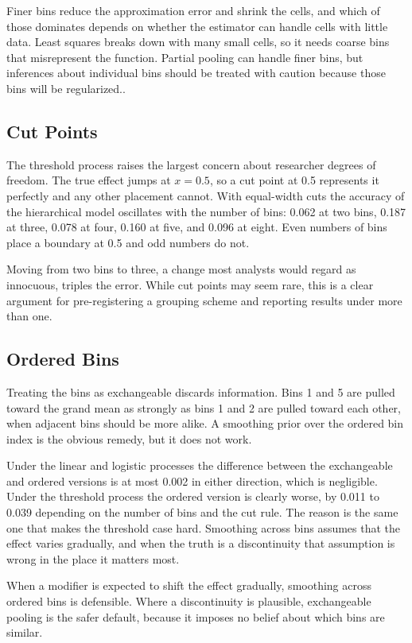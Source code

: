 \documentclass[12pt]{article}
\begin{document}
Finer bins reduce the approximation error and shrink the cells, and which of those dominates depends on whether the estimator can handle cells with little data.
Least squares breaks down with many small cells, so it needs coarse bins that misrepresent the function. 
Partial pooling can handle finer bins, but inferences about individual bins should be treated with caution because those bins will be regularized..

\subsection{Cut Points}

The threshold process raises the largest concern about researcher degrees of freedom.
The true effect jumps at $x = 0.5$, so a cut point at 0.5 represents it perfectly and any other placement cannot.
With equal-width cuts the accuracy of the hierarchical model oscillates with the number of bins: 0.062 at two bins, 0.187 at three, 0.078 at four, 0.160 at five, and 0.096 at eight.
Even numbers of bins place a boundary at 0.5 and odd numbers do not.

Moving from two bins to three, a change most analysts would regard as innocuous, triples the error.
While cut points may seem rare, this is a clear argument for pre-registering a grouping scheme and reporting results under more than one.

\subsection{Ordered Bins}

Treating the bins as exchangeable discards information. Bins 1 and 5 are pulled toward the grand mean as strongly as bins 1 and 2 are pulled toward each other, when adjacent bins should be more alike.
A smoothing prior over the ordered bin index is the obvious remedy, but it does not work.

Under the linear and logistic processes the difference between the exchangeable and ordered versions is at most 0.002 in either direction, which is negligible.
Under the threshold process the ordered version is clearly worse, by 0.011 to 0.039 depending on the number of bins and the cut rule.
The reason is the same one that makes the threshold case hard. Smoothing across bins assumes that the effect varies gradually, and when the truth is a discontinuity that assumption is wrong in the place it matters most.


When a modifier is expected to shift the effect gradually, smoothing across ordered bins is defensible.
Where a discontinuity is plausible, exchangeable pooling is the safer default, because it imposes no belief about which bins are similar. 
\end{document}
